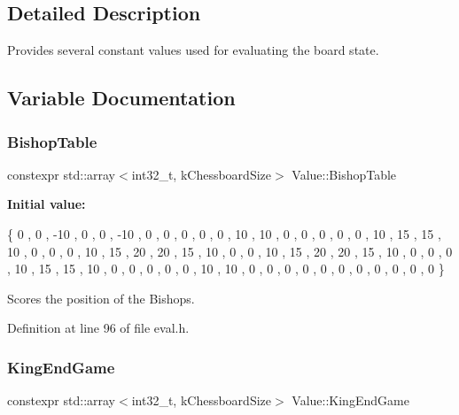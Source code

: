 \subsection{Detailed Description}
Provides several constant values used for evaluating the board state. 

\subsection{Variable Documentation}
\mbox{\label{namespaceValue_ab06336272528cf2e9e3772123f5eb5bb}} 
\subsubsection{\texorpdfstring{Bishop\+Table}{BishopTable}}
{\footnotesize\ttfamily constexpr std\+::array$<$int32\+\_\+t, k\+Chessboard\+Size$>$ Value\+::\+Bishop\+Table}

{\bfseries Initial value\+:}
\begin{DoxyCode}
\{
        0   ,   0   ,   -10 ,   0   ,   0   ,   -10 ,   0   ,   0   ,
        0   ,   0   ,   0   ,   10  ,   10  ,   0   ,   0   ,   0   ,
        0   ,   0   ,   10  ,   15  ,   15  ,   10  ,   0   ,   0   ,
        0   ,   10  ,   15  ,   20  ,   20  ,   15  ,   10  ,   0   ,
        0   ,   10  ,   15  ,   20  ,   20  ,   15  ,   10  ,   0   ,
        0   ,   0   ,   10  ,   15  ,   15  ,   10  ,   0   ,   0   ,
        0   ,   0   ,   0   ,   10  ,   10  ,   0   ,   0   ,   0   ,
        0   ,   0   ,   0   ,   0   ,   0   ,   0   ,   0   ,   0   
    \}
\end{DoxyCode}


Scores the position of the Bishops. 



Definition at line 96 of file eval.\+h.

\mbox{\label{namespaceValue_a581231b1446aff281ae15f755b875341}} 
\subsubsection{\texorpdfstring{King\+End\+Game}{KingEndGame}}
{\footnotesize\ttfamily constexpr std\+::array$<$int32\+\_\+t, k\+Chessboard\+Size$>$ Value\+::\+King\+End\+Game}

